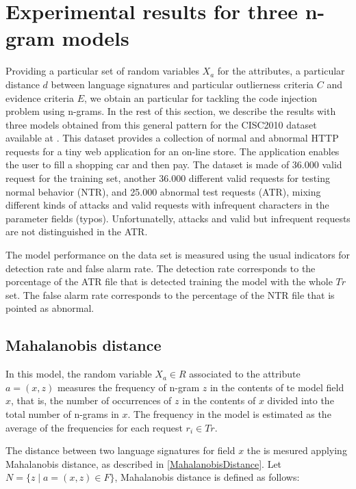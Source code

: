 \documentclass[runningheads,a4paper]{llncs}
\begin{document}
\section{Experimental results for three n-gram models}

Providing a particular set of random variables $X_a$ for the attributes, a particular distance $d$ between language signatures and particular outlierness criteria $C$ and evidence criteria $E$, we obtain an particular for tackling the code injection problem using n-grams. In the rest of this section, we describe the results with three models obtained from this general pattern for the CISC2010 dataset available at \cite{CISC2010}. This dataset provides a collection of normal and abnormal HTTP requests for a tiny web application for an on-line store. The application enables the user to fill a shopping car and then pay. The dataset is made of 36.000 valid request for the training set, another 36.000 different valid requests for testing normal behavior (NTR), and 25.000 abnormal test requests (ATR), mixing different kinds of attacks and valid requests with infrequent characters in the parameter fields (typos). Unfortunatelly, attacks and valid but infrequent requests are not distinguished in the ATR. 

The model performance on the data set is measured using the usual indicators for detection rate and false alarm rate. The detection rate corresponds to the porcentage of the ATR file that is detected training the model with the whole $Tr$ set. The false alarm rate corresponds to the percentage of the NTR file that is pointed as abnormal.

\subsection{Mahalanobis distance}

In this model, the random variable $X_a \in R$ associated to the attribute $a=(x,z)$ measures the frequency of n-gram $z$ in the contents of te model field $x$, that is, the number of occurrences of $z$ in the contents of $x$ divided into the total number of n-grams in $x$. The frequency in the model is estimated as the average of the frequencies for each request $r_i \in Tr$.

The distance between two language signatures for field $x$ the is mesured applying Mahalanobis distance, as described in \ref{MahalanobisDistance}. Let $N = \{ z \mid a=(x,z) \in F  \}$, Mahalanobis distance is defined as follows:
\end{document}
